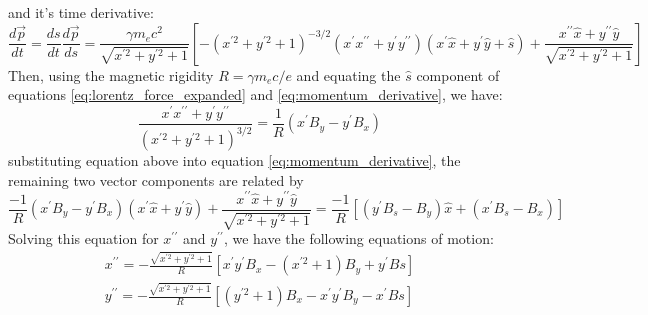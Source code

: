 \documentclass[a4paper,12pt]{article}
\begin{document}
and it's time derivative:
\begin{equation}
    \frac{d\vec{p}}{dt} = \frac{ds}{dt}\frac{d\vec{p}}{ds} = \frac{\gamma m_e c^2}{\sqrt{x^{\prime 2} + y^{\prime 2} + 1}}
    \left[-(x^{\prime 2}+y^{\prime 2}+1)^{-3/2}(x^{\prime} x^{\prime\prime} + y^{\prime} y^{\prime\prime})(x^{\prime}\hat{x} + y^{\prime}\hat{y} + \hat{s})
    + \frac{x^{\prime\prime}\hat{x} + y^{\prime\prime}\hat{y}}{\sqrt{x^{\prime 2} + y^{\prime 2} + 1}}\right]
    \label{eq:momentum_derivative}
\end{equation}
Then, using the magnetic rigidity $R = \gamma m_e c / e$ and equating the $\hat{s}$ component of equations \eqref{eq:lorentz_force_expanded}
and \eqref{eq:momentum_derivative}, we have:
\begin{equation}
    \frac{x{^\prime}x^{\prime\prime} + y^{\prime}y^{\prime\prime}}{\left(x^{\prime 2} + y^{\prime 2 } + 1\right)^{3/2}} = \frac{1}{R}\left(x^{\prime}B_y - y^{\prime}B_x\right)
\end{equation}
substituting equation above into equation \eqref{eq:momentum_derivative}, the remaining two vector components are related by
\begin{equation}
    \frac{-1}{R}\left(x^{\prime} B_y - y^{\prime} B_x \right)\left(x^{\prime}\hat{x} + y^{\prime}\hat{y}\right)
     + \frac{x^{\prime \prime}\hat{x} + y^{\prime\prime}\hat{y}}{\sqrt{x^{\prime 2} + y^{\prime 2} + 1}} = \frac{-1}{R}
     \left[\left(y^{\prime}B_s - B_y\right)\hat{x} + \left(x^{\prime}B_s - B_x\right)\right]
\end{equation}
Solving this equation for $x^{\prime\prime}$ and $y^{\prime\prime}$, we have the following equations of motion:
\begin{equation}
    \begin{aligned}
        x^{\prime\prime} = -\frac{\sqrt{x^{\prime 2} + y^{\prime 2} + 1}}{R}\left[x^{\prime}y^{\prime}B_x -\left(x^{\prime 2} + 1\right)B_y +y^{\prime}Bs\right]\\
        y^{\prime\prime} = -\frac{\sqrt{x^{\prime 2} + y^{\prime 2} + 1}}{R}\left[\left(y^{\prime 2} + 1\right)B_x -x^{\prime}y^{\prime}B_y -x^{\prime}Bs\right]
    \end{aligned}
    \label{eq:equations_of_motion}
\end{equation}
\end{document}
